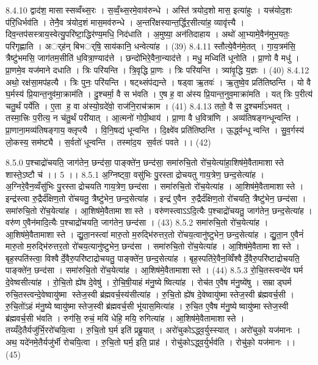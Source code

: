 8.4.10
द्वाद॑श॒ मासास्सव्वँथ्स॒रः । स॒व्वँ॒थ्स॒रमे॒वाव॑रुन्धे । अस्ति॑ त्रयोद॒शो मास॒ इत्या॑हुः । यत्त्र॑योद॒शः प॑रि॒धिर्भव॑ति । तेनै॒व त्र॑योद॒शं मास॒मव॑रुन्धे । अ॒न्तरि॑क्षस्यान्त॒र्द्धिर॒सीत्या॑ह॒ व्यावृ॑त्त्यै । दिव॒न्तप॑सस्त्राय॒स्वेत्यु॒परि॑ष्टा॒द्धिर॑ण्य॒मधि॒ निद॑धाति । अ॒मुष्या॒ अन॑तिदाहाय । अथो॑ आ॒भ्यामे॒वैन॑मुभ॒यतः॒ परि॑गृह्णाति । अर््ह॑न् बिभर््षि॒ साय॑कानि॒ धन्वेत्या॑ह । (39)
8.4.11
स्तौत्ये॒वैन॑मे॒तत् । गा॒य॒त्रम॑सि॒ त्रैष्टु॑भमसि॒ जाग॑तम॒सीति॑ ध॒वित्रा॒ण्याद॑त्ते । छन्दो॑भिरे॒वैना॒न्याद॑त्ते । मधु॒ मध्विति॑ धूनोति । प्रा॒णो वै मधु॑ । प्रा॒णमे॒व यज॑माने दधाति । त्रिः परि॑यन्ति । त्रि॒वृद्धि प्रा॒णः । त्रिः परि॑यन्ति । त्र्या॑वृ॒द्धि य॒ज्ञः । (40)
8.4.12
अथो॒ रक्ष॑सा॒मप॑हत्यै । त्रिः पुनः॒ परि॑यन्ति । षट्थ्संप॑द्यन्ते । षड्वा ऋ॒तवः॑ । ऋ॒तुष्वे॒व प्रति॑तिष्ठन्ति । यो वै घ॒र्मस्य॑ प्रि॒यान्त॒नुव॑मा॒क्राम॑ति । दु॒श्चर्मा॒ वै स भ॑वति । ए॒ष ह॒ वा अ॑स्य प्रि॒यान्त॒नुव॒माक्रा॑मति । यत् त्रिः प॒रीत्य॑ चतु॒र्थं पर्ये॑ति । ए॒ता ह॒ वा अ॑स्यो॒ग्रदे॑वो॒ राज॑नि॒राच॑क्राम । (41)
8.4.13
ततो॒ वै स दु॒श्चर्मा॑ऽभवत् । तस्मा॒त्त्रिः प॒रीत्य॒ न च॑तु॒र्थं परी॑यात् । आ॒त्मनो॑ गोपी॒थाय॑ । प्रा॒णा वै ध॒वित्रा॑णि । अव्य॑तिषङ्गन्धून्वन्ति । प्रा॒णाना॒मव्य॑तिषङ्गाय॒ क्लृप्त्यै । वि॒नि॒षद्य॑ धून्वन्ति । दि॒क्ष्वे॑व प्रति॑तिष्ठन्ति । ऊ॒र्द्ध्वन्धून्वन्ति । सु॒व॒र्गस्य॑ लो॒कस्य॒ सम॑ष्ट्यै । स॒र्वतो॑ धून्वन्ति । तस्मा॑द॒य स॒र्वतः॑ पवते ।। (42)
\anuvakamend

8.5.0
प॒श्चाद्रो॑चयति॒ जाग॑तेन॒ छन्द॑सा॒ पाङ्क्ते॑न॒ छन्द॑सा॒ समा॑रुचि॒तो रो॑च॒येत्या॑हा॒शिष॑मे॒वैतामाशास्ते शास्ते॒ऽष्टौ च॑ ।। 5 ।।
8.5.1
अ॒ग्निष्ट्वा॒ वसु॑भिः पु॒रस्ताद्रोचयतु गाय॒त्रेण॒ छन्द॒सेत्या॑ह । अ॒ग्निरे॒वैन॒व्वँसु॑भिः पु॒रस्ताद्रोचयति गाय॒त्रेण॒ छन्द॑सा । समा॑रुचि॒तो रो॑च॒येत्या॑ह । आ॒शिष॑मे॒वैतामाशास्ते । इन्द्र॑स्त्वा रु॒द्रैर्द॑क्षिण॒तो रो॑चयतु॒ त्रैष्टु॑भेन॒ छन्द॒सेत्या॑ह । इन्द्र॑ ए॒वैन रु॒द्रैर्द॑क्षिण॒तो रो॑चयति॒ त्रैष्टु॑भेन॒ छन्द॑सा । समा॑रुचि॒तो रो॑च॒येत्या॑ह । आ॒शिष॑मे॒वैतामा शास्ते । वरु॑णस्त्वाऽऽदि॒त्यैः प॒श्चाद्रो॑चयतु॒ जाग॑तेन॒ छन्द॒सेत्या॑ह । वरु॑ण ए॒वैन॑मादि॒त्यैः प॒श्चाद्रो॑चयति॒ जाग॑तेन॒ छन्द॑सा । (43)
8.5.2
समा॑रुचि॒तो रो॑च॒येत्या॑ह । आ॒शिष॑मे॒वैतामाशास्ते । द्यु॒ता॒नस्त्वा॑ मारु॒तो म॒रुद्भि॑रुत्तर॒तो रो॑चय॒त्वानु॑ष्टुभेन॒ छन्द॒सेत्या॑ह । द्यु॒ता॒न ए॒वैनं॑ मारु॒तो म॒रुद्भि॑रुत्तर॒तो रो॑चय॒त्यानु॑ष्टुभेन॒ छन्द॑सा । समा॑रुचि॒तो रो॑च॒येत्या॑ह । आ॒शिष॑मे॒वैतामा शास्ते । बृह॒स्पति॑स्त्वा॒ विश्वैर्दे॒वैरु॒परि॑ष्टाद्रोचयतु॒ पाङ्क्ते॑न॒ छन्द॒सेत्या॑ह । बृह॒स्पति॑रे॒वैन॒व्विँश्वैर्दे॒वैरु॒परि॑ष्टाद्रोचयति॒ पाङ्क्ते॑न॒ छन्द॑सा । समा॑रुचि॒तो रो॑च॒येत्या॑ह । आ॒शिष॑मे॒वैतामाशास्ते । (44)
8.5.3
रो॒चि॒तस्त्वन्दे॑व घर्म दे॒वेष्वसीत्या॑ह । रो॒चि॒तो ह्ये॑ष दे॒वेषु॑ । रो॒चि॒षी॒याहं म॑नु॒ष्येष्वित्या॑ह । रोच॑त ए॒वैष म॑नु॒ष्ये॑षु । सम्राड्घर्म रुचि॒तस्त्वन्दे॒वेष्वायु॑ष्मा स्तेज॒स्वी ब्र॑ह्मवर्च॒स्य॑सीत्या॑ह । रु॒चि॒तो ह्ये॑ष दे॒वेष्वायु॑ष्मास्तेज॒स्वी ब्र॑ह्मवर्च॒सी । रु॒चि॒तो॑ऽहं म॑नु॒ष्येष्वायु॑ष्मास्तेज॒स्वी ब्र॑ह्मवर्च॒सी भू॑यास॒मित्या॑ह । रु॒चि॒त ए॒वैष म॑नु॒ष्येष्वायु॑ष्मास्तेज॒स्वी ब्र॑ह्मवर्च॒सी भ॑वति । रुग॑सि॒ रुचं॒ मयि॑ धेहि॒ मयि॒ रुगित्या॑ह । आ॒शिष॑मे॒वैतामाशास्ते । तय्यँदे॒तैर्यजु॑र्भि॒ररो॑चयि॒त्वा । रु॒चि॒तो घ॒र्म इति॑ प्रब्रू॒यात् । अरो॑चुकोऽद्ध्व॒र्युस्स्यात् । अरो॑चुको॒ यज॑मानः । अथ॒ यदे॑नमे॒तैर्यजु॑र्भी रोचयि॒त्वा । रु॒चि॒तो घर्म॒ इति॒ प्राह॑ । रोचु॑कोऽद्ध्व॒र्युर्भव॑ति । रोचु॑को॒ यज॑मानः ।। (45)
\anuvakamend

